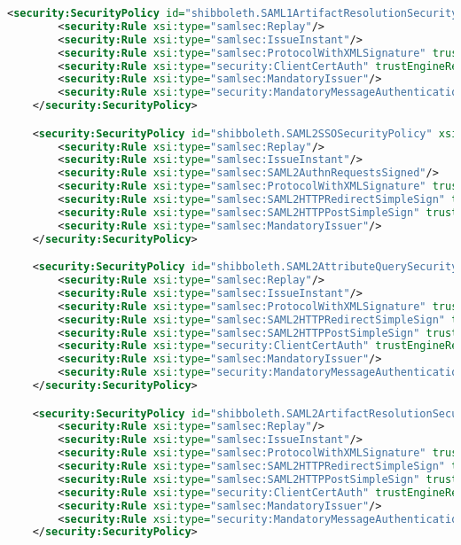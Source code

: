 \begin{lstlisting}[language=xml]
    <security:SecurityPolicy id="shibboleth.SAML1ArtifactResolutionSecurityPolicy" xsi:type="security:SecurityPolicyType">
        <security:Rule xsi:type="samlsec:Replay"/>
        <security:Rule xsi:type="samlsec:IssueInstant"/>
        <security:Rule xsi:type="samlsec:ProtocolWithXMLSignature" trustEngineRef="shibboleth.SignatureTrustEngine"/>
        <security:Rule xsi:type="security:ClientCertAuth" trustEngineRef="shibboleth.CredentialTrustEngine"/>
        <security:Rule xsi:type="samlsec:MandatoryIssuer"/>
        <security:Rule xsi:type="security:MandatoryMessageAuthentication"/>
    </security:SecurityPolicy>

    <security:SecurityPolicy id="shibboleth.SAML2SSOSecurityPolicy" xsi:type="security:SecurityPolicyType">
        <security:Rule xsi:type="samlsec:Replay"/>
        <security:Rule xsi:type="samlsec:IssueInstant"/>
        <security:Rule xsi:type="samlsec:SAML2AuthnRequestsSigned"/>
        <security:Rule xsi:type="samlsec:ProtocolWithXMLSignature" trustEngineRef="shibboleth.SignatureTrustEngine"/>
        <security:Rule xsi:type="samlsec:SAML2HTTPRedirectSimpleSign" trustEngineRef="shibboleth.SignatureTrustEngine"/>
        <security:Rule xsi:type="samlsec:SAML2HTTPPostSimpleSign" trustEngineRef="shibboleth.SignatureTrustEngine"/>
        <security:Rule xsi:type="samlsec:MandatoryIssuer"/>
    </security:SecurityPolicy>

    <security:SecurityPolicy id="shibboleth.SAML2AttributeQuerySecurityPolicy" xsi:type="security:SecurityPolicyType">
        <security:Rule xsi:type="samlsec:Replay"/>
        <security:Rule xsi:type="samlsec:IssueInstant"/>
        <security:Rule xsi:type="samlsec:ProtocolWithXMLSignature" trustEngineRef="shibboleth.SignatureTrustEngine"/>
        <security:Rule xsi:type="samlsec:SAML2HTTPRedirectSimpleSign" trustEngineRef="shibboleth.SignatureTrustEngine"/>
        <security:Rule xsi:type="samlsec:SAML2HTTPPostSimpleSign" trustEngineRef="shibboleth.SignatureTrustEngine"/>
        <security:Rule xsi:type="security:ClientCertAuth" trustEngineRef="shibboleth.CredentialTrustEngine"/>
        <security:Rule xsi:type="samlsec:MandatoryIssuer"/>
        <security:Rule xsi:type="security:MandatoryMessageAuthentication"/>
    </security:SecurityPolicy>

    <security:SecurityPolicy id="shibboleth.SAML2ArtifactResolutionSecurityPolicy" xsi:type="security:SecurityPolicyType">
        <security:Rule xsi:type="samlsec:Replay"/>
        <security:Rule xsi:type="samlsec:IssueInstant"/>
        <security:Rule xsi:type="samlsec:ProtocolWithXMLSignature" trustEngineRef="shibboleth.SignatureTrustEngine"/>
        <security:Rule xsi:type="samlsec:SAML2HTTPRedirectSimpleSign" trustEngineRef="shibboleth.SignatureTrustEngine"/>
        <security:Rule xsi:type="samlsec:SAML2HTTPPostSimpleSign" trustEngineRef="shibboleth.SignatureTrustEngine"/>
        <security:Rule xsi:type="security:ClientCertAuth" trustEngineRef="shibboleth.CredentialTrustEngine"/>
        <security:Rule xsi:type="samlsec:MandatoryIssuer"/>
        <security:Rule xsi:type="security:MandatoryMessageAuthentication"/>
    </security:SecurityPolicy>


\end{lstlisting}

